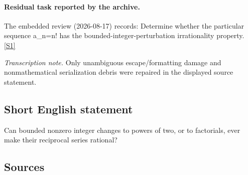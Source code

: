 \documentclass[11pt,a4paper]{article}
\newcommand{\sref}[2]{\hyperlink{source:#1:#2}{[S#2]}}
\begin{document}
\paragraph{Residual task reported by the archive.}

The embedded review (2026-08-17) records: Determine whether the particular sequence a\_n=n! has the bounded-integer-perturbation irrationality property. \sref{2017}{1}

{\small\emph{Transcription note.} Only unambiguous escape/formatting damage and nonmathematical serialization debris were repaired in the displayed source statement.}

\subsection{Short English statement}

Can bounded nonzero integer changes to powers of two, or to factorials, ever make their reciprocal series rational?

\subsection{Sources}
\end{document}

